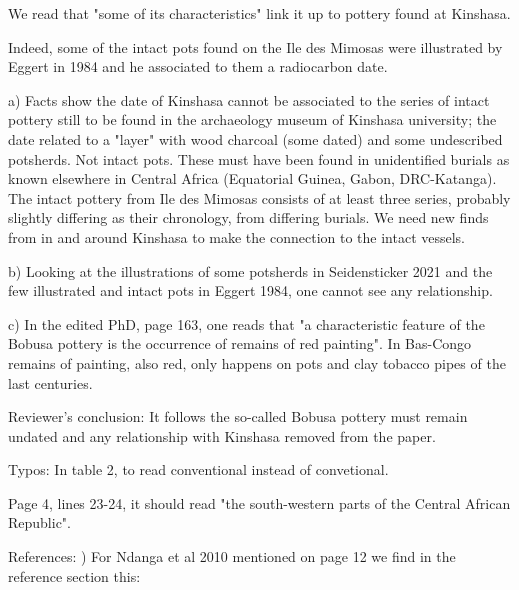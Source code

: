 \begin{reviewer}
We read that "some of its characteristics" link it up to pottery found at Kinshasa.

Indeed, some of the intact pots found on the Ile des Mimosas were illustrated by Eggert in 1984 and he associated to them a radiocarbon date.

a) Facts show the date of Kinshasa cannot be associated to the series of intact pottery still to be found in the archaeology museum of Kinshasa university; the date related to a "layer" with wood charcoal (some dated) and some undescribed potsherds. Not intact pots. These must have been found in unidentified burials as known elsewhere in Central Africa (Equatorial Guinea, Gabon, DRC-Katanga). The intact pottery from Ile des Mimosas consists of at least three series, probably slightly differing as their chronology, from differing burials. We need new finds from in and around Kinshasa to make the connection to the intact vessels.

b) Looking at the illustrations of some potsherds in Seidensticker 2021 and the few illustrated and intact pots in Eggert 1984, one cannot see any relationship.

c) In the edited PhD, page 163, one reads that "a characteristic feature of the Bobusa pottery is the occurrence of remains of red painting". In Bas-Congo remains of painting, also red, only happens on pots and clay tobacco pipes of the last centuries.

Reviewer's conclusion: It follows the so-called Bobusa pottery must remain undated and any relationship with Kinshasa removed from the paper.


Typos:
\point In table 2, to read conventional instead of convetional.


\point Page 4, lines 23-24, it should read "the south-western parts of the Central African Republic".


References:
) For Ndanga et al 2010 mentioned on page 12 we find in the reference section this:


\end{reviewer}
